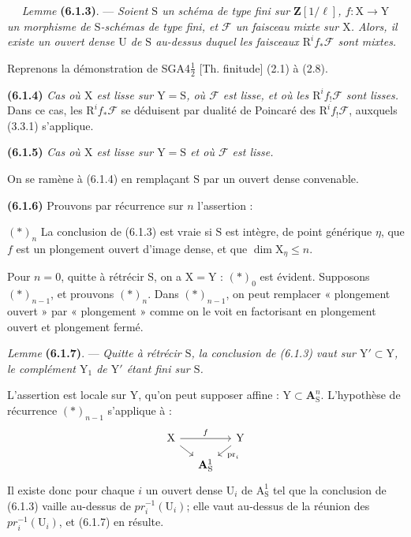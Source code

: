 \documentclass[11pt,leqno]{article}
\newcommand{\Page}[1]{\ifvmode\noindent\else\unskip\ \fi{\footnotesize\textcolor{gray}{[p.\,#1]}}\ \ignorespaces}
\begin{document}
\Page{244}
\textit{Lemme} \textbf{(6.1.3)}. — \textit{Soient \(\mathrm{S}\)
un schéma de type fini sur \(\mathbf{Z}[1/\ell]\),
\(f:\mathrm{X}\to\mathrm{Y}\) un morphisme de \(\mathrm{S}\)-schémas
de type fini, et \(\mathscr{F}\) un faisceau mixte sur \(\mathrm{X}\).
Alors, il existe un ouvert dense \(\mathrm{U}\) de \(\mathrm{S}\)
au-dessus duquel les faisceaux \(\mathrm{R}^if_*\mathscr{F}\) sont
mixtes.}

Reprenons la démonstration de SGA4\(\frac{1}{2}\) [Th. finitude]
(2.1) à (2.8).

\textbf{(6.1.4)} \textit{Cas où \(\mathrm{X}\) est lisse sur
\(\mathrm{Y}=\mathrm{S}\), où \(\mathscr{F}\) est lisse, et où les
\(\mathrm{R}^if_!\mathscr{F}\) sont lisses.} Dans ce cas, les
\(\mathrm{R}^if_*\mathscr{F}\) se déduisent par dualité de Poincaré
des \(\mathrm{R}^if_!\mathscr{F}\), auxquels (3.3.1) s’applique.

\textbf{(6.1.5)} \textit{Cas où \(\mathrm{X}\) est lisse sur
\(\mathrm{Y}=\mathrm{S}\) et où \(\mathscr{F}\) est lisse.}

On se ramène à (6.1.4) en remplaçant \(\mathrm{S}\) par un ouvert
dense convenable.

\textbf{(6.1.6)} Prouvons par récurrence sur \(n\) l’assertion :

\((*)_n\) La conclusion de (6.1.3) est vraie si \(\mathrm{S}\) est
intègre, de point générique \(\eta\), que \(f\) est un plongement
ouvert d’image dense, et que \(\dim\mathrm{X}_\eta\leq n\).

Pour \(n=0\), quitte à rétrécir \(\mathrm{S}\), on a
\(\mathrm{X}=\mathrm{Y}\) : \((*)_0\) est évident. Supposons
\((*)_{n-1}\), et prouvons \((*)_n\). Dans \((*)_{n-1}\), on peut
remplacer « plongement ouvert » par « plongement » comme on le voit
en factorisant en plongement ouvert et plongement fermé.

\textit{Lemme} \textbf{(6.1.7)}. — \textit{Quitte à rétrécir
\(\mathrm{S}\), la conclusion de \textup{(6.1.3)} vaut sur
\(\mathrm{Y}'\subset\mathrm{Y}\), le complément \(\mathrm{Y}_1\)
de \(\mathrm{Y}'\) étant fini sur \(\mathrm{S}\).}

L’assertion est locale sur \(\mathrm{Y}\), qu’on peut supposer
affine : \(\mathrm{Y}\subset\mathbf{A}_{\mathrm{S}}^n\).
L’hypothèse de récurrence \((*)_{n-1}\) s’applique à :
\[
\begin{tikzcd}[column sep=small,row sep=small]
\mathrm{X} \arrow[rr,"f"] \arrow[dr] &&
\mathrm{Y} \arrow[dl,"\mathrm{pr}_i"] \\
& \mathbf{A}_{\mathrm{S}}^1 &
\end{tikzcd}
\]
Il existe donc pour chaque \(i\) un ouvert dense \(\mathrm{U}_i\)
de \(\mathrm{A}_{\mathrm{S}}^1\) tel que la conclusion de (6.1.3)
vaille au-dessus de \(\mathit{pr}_i^{-1}(\mathrm{U}_i)\); elle vaut
au-dessus de la réunion des \(\mathit{pr}_i^{-1}(\mathrm{U}_i)\),
et (6.1.7) en résulte.
\end{document}
